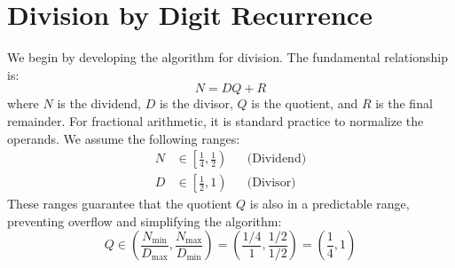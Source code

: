 \documentclass{article}
\begin{document}
\section{Division by Digit Recurrence}
\label{sec:division}
We begin by developing the algorithm for division.
The fundamental relationship is:
\begin{equation}
  \label{eq:division:relation}
  N = D Q + R
\end{equation}
where $N$ is the dividend, $D$ is the divisor, $Q$ is the quotient, and $R$ is the final remainder.
For fractional arithmetic, it is standard practice to normalize the operands.
We assume the following ranges:
\begin{align*}
  N &\in \left[\frac{1}{4}, \frac{1}{2}\right) && \text{(Dividend)} \\
  D &\in \left[\frac{1}{2}, 1\right) && \text{(Divisor)}
\end{align*}
These ranges guarantee that the quotient $Q$ is also in a predictable range, preventing overflow and simplifying the algorithm:
\begin{equation}
  \label{eq:division:q_range}
  Q \in \left(\frac{N_{\min}}{D_{\max}}, \frac{N_{\max}}{D_{\min}}\right) = \left(\frac{1/4}{1}, \frac{1/2}{1/2}\right) = \left(\frac{1}{4}, 1\right)
\end{equation}
\end{document}
